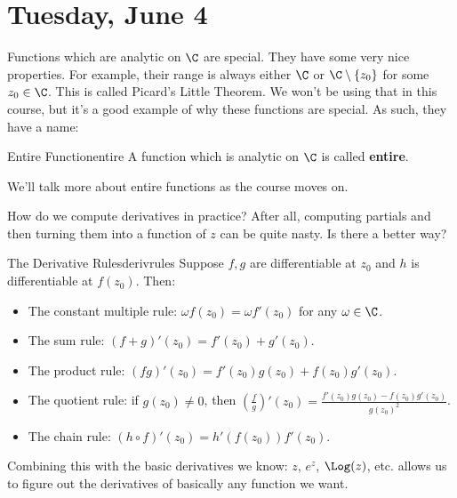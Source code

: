 \section{Tuesday, June 4}


Functions which are analytic on $\C$ are special. They have some very nice properties. For example, their range is always either $\C$ or $\C\setminus\{z_0\}$ for some $z_0\in\C$. This is called Picard's Little Theorem. We won't be using that in this course, but it's a good example of why these functions are special. As such, they have a name:

\begin{defbo}{Entire Function}{entire}
A function which is analytic on $\C$ is called {\bf entire}.
\end{defbo}

We'll talk more about entire functions as the course moves on.

How do we compute derivatives in practice? After all, computing partials and then turning them into a function of $z$ can be quite nasty. Is there a better way?

\begin{thmbo}{The Derivative Rules}{derivrules}
Suppose $f,g$ are differentiable at $z_0$ and $h$ is differentiable at $f(z_0)$. Then:

\begin{itemize}
\item The constant multiple rule: $\omega f(z_0) = \omega f'(z_0)$ for any $\omega \in \C$.
\item The sum rule: $(f+g)'(z_0) = f'(z_0) + g'(z_0)$.
\item The product rule: $(fg)'(z_0) = f'(z_0)g(z_0) + f(z_0)g'(z_0)$.
\item The quotient rule: if $g(z_0) \ne 0$, then $\left(\frac{f}{g}\right)'(z_0) = \frac{f'(z_0)g(z_0) - f(z_0)g'(z_0)}{g(z_0)^2}$.
\item The chain rule: $(h\circ f)'(z_0) = h'(f(z_0))f'(z_0)$.
\end{itemize}
\end{thmbo}

Combining this with the basic derivatives we know: $z$, $e^z$, $\Log(z)$, etc. allows us to figure out the derivatives of basically any function we want.

